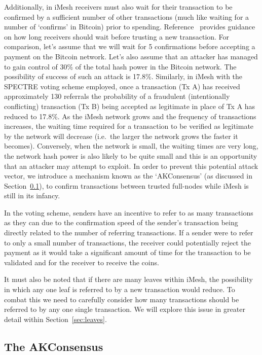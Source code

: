 \documentclass[a4paper,10pt,twocolumn]{article}
\begin{document}
 Additionally, in iMesh receivers must also wait for their transaction to be confirmed by a sufficient number of other transactions 
 (much like waiting for a number of `confirms' in Bitcoin) prior to spending. Reference~\cite{spectre} provides guidance on how long receivers 
 should wait before trusting a new transaction. For comparison, let's assume that we will wait for 5 confirmations before accepting a 
 payment on the Bitcoin network. Let's also assume that an attacker has managed to gain control of 30\% of the total hash power in the 
 Bitcoin network. The possibility of success of such an attack is 17.8\%\cite{btc}. Similarly, in iMesh with the SPECTRE voting scheme 
 employed, once a transaction (Tx A) has received approximately 130 referrals the probability of a fraudulent (intentionally conflicting) 
 transaction (Tx B) being accepted as legitimate in place of Tx A has reduced to 17.8\%. As the iMesh network grows and the frequency of 
 transactions increases, the waiting time required for a transaction to be verified as legitimate by the network will decrease (i.e.\ the 
 larger the network grows the faster it becomes). Conversely, when the network is small, the waiting times are very long, the 
 network hash power is also likely to be quite small and this is an opportunity that an attacker may attempt to exploit. 
In order to prevent this potential attack vector, we introduce a mechanism known as the `AKConsensus' (as discussed in Section~\ref{sec:fbam}), 
to confirm transactions between trusted full-nodes while iMesh is still in its infancy.

In the voting scheme, senders have an incentive to refer to as many transactions as they can due to the confirmation speed of the 
sender's transaction being directly related to the number of referring transactions. If a sender were to refer to only a small number of 
transactions, the receiver could potentially reject the payment as it would take a significant amount of time for the transaction to be 
validated and for the receiver to receive the coins.

It must also be noted that if there are many leaves within iMesh, the possibility in which any one leaf is referred to by a new 
transaction would reduce. To combat this we need to carefully consider how many transactions should be referred to by any one single 
transaction. We will explore this issue in greater detail within Section~\ref{sec:leaves}.

\subsection{The AKConsensus}
\label{sec:fbam}
\end{document}
